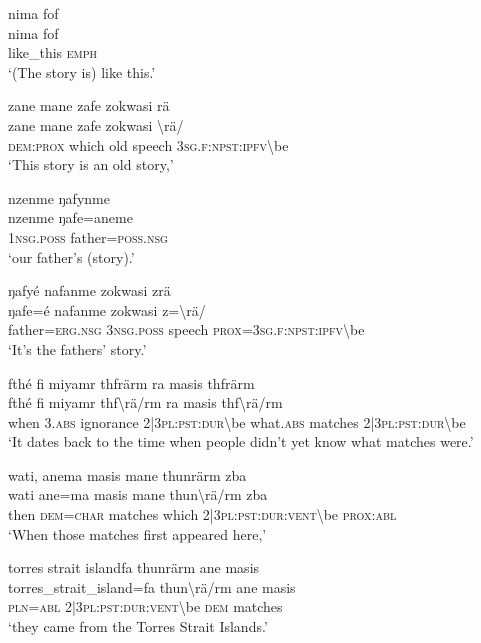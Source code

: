 \ea\label{ex:11:a2475}
nima fof\\
\gll nima	fof\\
     like\_this	\textsc{emph}\\
\glt `(The story is) like this.'
\z

\ea\label{ex:11:a2476}
zane mane zafe zokwasi rä\\
\gll zane	mane	zafe	zokwasi	{\textbackslash}rä/\\
     \textsc{dem}:\textsc{prox}	which	old	speech	3\textsc{sg}.\textsc{f}:\textsc{npst}:\textsc{ipfv}{\textbackslash}be\\
\glt `This story is an old story,'
\z

\ea\label{ex:11:a2477}
nzenme ŋafynme\\
\gll nzenme	ŋafe=aneme\\
     1\textsc{nsg}.\textsc{poss}	father=\textsc{poss}.\textsc{nsg}\\
\glt `our father's (story).'
\z

\ea\label{ex:11:a2479}
ŋafyé nafanme zokwasi zrä\\
\gll ŋafe=é	nafanme	zokwasi	z={\textbackslash}rä/\\
     father=\textsc{erg}.\textsc{nsg}	3\textsc{nsg}.\textsc{poss}	speech	\textsc{prox}=3\textsc{sg}.\textsc{f}:\textsc{npst}:\textsc{ipfv}{\textbackslash}be\\
\glt `It's the fathers' story.'
\z

\ea\label{ex:11:a2481}
fthé fi miyamr thfrärm ra masis thfrärm\\
\gll fthé	fi	miyamr	thf{\textbackslash}rä/rm	ra	masis	thf{\textbackslash}rä/rm\\
     when	3.\textsc{abs}	ignorance	2|3\textsc{pl}:\textsc{pst}:\textsc{dur}{\textbackslash}be	what.\textsc{abs}	matches	2|3\textsc{pl}:\textsc{pst}:\textsc{dur}{\textbackslash}be\\
\glt `It dates back to the time when people didn't yet know what matches were.'
\z

\ea\label{ex:11:a2483}
wati, anema masis mane thunrärm zba\\
\gll wati	ane=ma	masis	mane	thun{\textbackslash}rä/rm	zba\\
     then	\textsc{dem}=\textsc{char}	matches	which	2|3\textsc{pl}:\textsc{pst}:\textsc{dur}:\textsc{vent}{\textbackslash}be	\textsc{prox}:\textsc{abl}\\
\glt `When those matches first appeared here,'
\z

\ea\label{ex:11:a2484}
torres strait islandfa thunrärm ane masis\\
\gll torres\_strait\_island=fa	thun{\textbackslash}rä/rm	ane	masis\\
     \textsc{pln}=\textsc{abl}	2|3\textsc{pl}:\textsc{pst}:\textsc{dur}:\textsc{vent}{\textbackslash}be	\textsc{dem}	matches\\
\glt `they came from the Torres Strait Islands.'
\z

